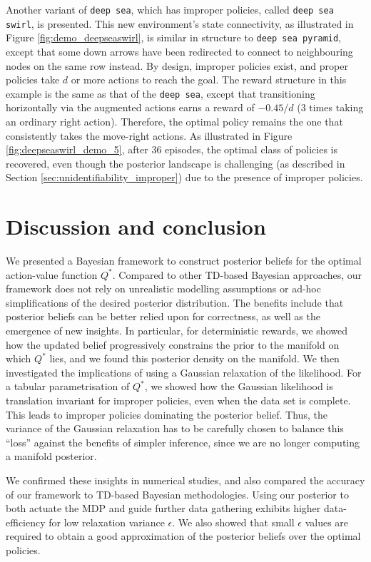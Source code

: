 \documentclass{amsart}
\newcommand{\depth}{d}
\begin{document}
Another variant of \texttt{deep sea}, which has improper policies, called \texttt{deep sea swirl}, is presented. This new environment's state connectivity, as illustrated in Figure \ref{fig:demo_deepseaswirl}, is similar in structure to \texttt{deep sea pyramid}, except that some down arrows have been redirected to connect to neighbouring nodes on the same row instead. By design, improper policies exist, and proper policies take $\depth$ or more actions to reach the goal. The reward structure in this example is the same as that of the \texttt{deep sea}, except that transitioning horizontally via the augmented actions earns a reward of $-0.45/\depth$ ($3$ times taking an ordinary right action). Therefore, the optimal policy remains the one that consistently takes the move-right actions. As illustrated in Figure \ref{fig:deepseaswirl_demo_5}, after $36$ episodes, the optimal class of policies is recovered, even though the posterior landscape is challenging (as described in Section \ref{sec:unidentifiability_improper}) due to the presence of improper policies.


\section{Discussion and conclusion}
\label{sec:conclude}



We presented a Bayesian framework to construct posterior beliefs for the optimal action-value function $Q^*$. Compared to other TD-based Bayesian approaches, our framework does not rely on unrealistic modelling assumptions or ad-hoc simplifications of the desired posterior distribution. The benefits include that posterior beliefs can be better relied upon for correctness, as well as the emergence of new insights. In particular, for deterministic rewards, we showed how the updated belief progressively constrains the prior to the manifold on which $Q^*$ lies, and we found this posterior density on the manifold. We then investigated the implications of using a Gaussian relaxation of the likelihood. For a tabular parametrisation of $Q^{\ast}$, we showed how the Gaussian likelihood is translation invariant for improper policies, even when the data set is complete. This leads to improper policies dominating the posterior belief. Thus, the variance of the Gaussian relaxation has to be carefully chosen to balance this ``loss'' against the benefits of simpler inference, since we are no longer computing a manifold posterior.

We confirmed these insights in numerical studies, and also compared the accuracy of our framework to TD-based Bayesian methodologies. Using our posterior to both actuate the MDP and guide further data gathering exhibits higher data-efficiency for low relaxation variance $\epsilon$. We also showed that small $\epsilon$ values are required to obtain a good approximation of the posterior beliefs over the optimal policies.
\end{document}

